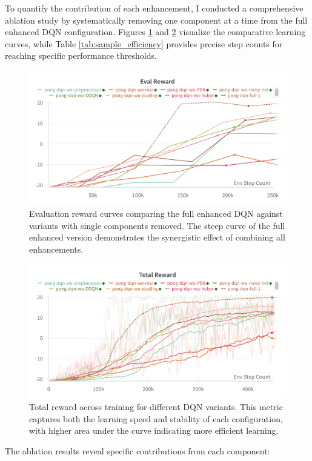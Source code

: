 \documentclass[a4paper]{article}
\begin{document}
To quantify the contribution of each enhancement, I conducted a comprehensive ablation study by systematically removing one component at a time from the full enhanced DQN configuration. Figures \ref{fig:ablation-eval} and \ref{fig:ablation-total} visualize the comparative learning curves, while Table \ref{tab:sample_efficiency} provides precise step counts for reaching specific performance thresholds.

\begin{figure}[H]
\centering
\includegraphics[width=0.5\linewidth]{figures/ablation-eval}
\caption{Evaluation reward curves comparing the full enhanced DQN against variants with single components removed. The steep curve of the full enhanced version demonstrates the synergistic effect of combining all enhancements.}
\label{fig:ablation-eval}
\end{figure}

\begin{figure}[H]
\centering
\includegraphics[width=0.5\linewidth]{figures/ablation-total}
\caption{Total reward across training for different DQN variants. This metric captures both the learning speed and stability of each configuration, with higher area under the curve indicating more efficient learning.}
\label{fig:ablation-total}
\end{figure}

The ablation results reveal specific contributions from each component:
\end{document}
